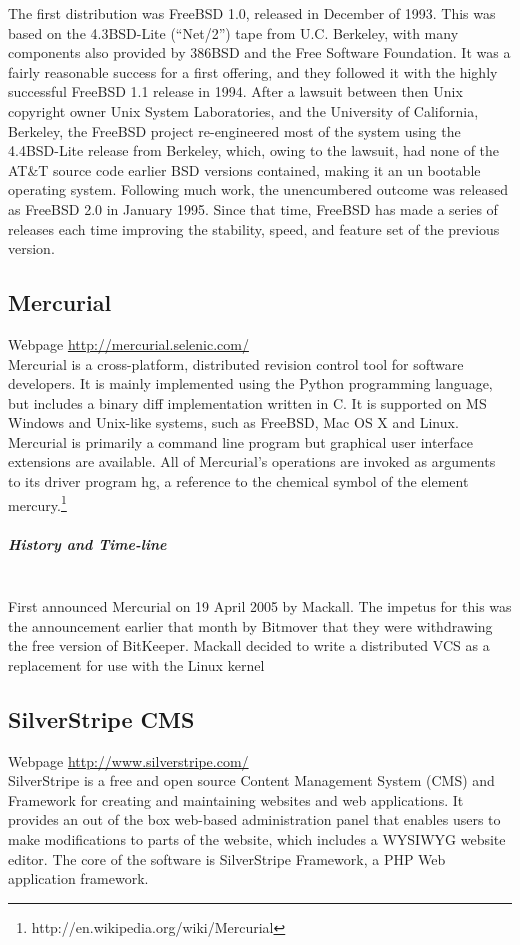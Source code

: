 \documentclass[11pt]{article} %
\begin{document}
The first distribution was FreeBSD 1.0, released in December of 1993. This was based on the 4.3BSD-Lite (“Net/2”) tape from U.C. Berkeley, with many components also provided by 386BSD and the Free Software Foundation. It was a fairly reasonable success for a first offering, and they followed it with the highly successful FreeBSD 1.1 release in  1994.
 After a lawsuit between then Unix copyright owner Unix System Laboratories, and the University of California, Berkeley, the FreeBSD project re-engineered most of the system using the 4.4BSD-Lite release from Berkeley, which, owing to the lawsuit, had none of the AT\&T source code earlier BSD versions contained, making it an un bootable operating system. Following much work, the unencumbered outcome was released as FreeBSD 2.0 in January 1995.
Since that time, FreeBSD has made a series of releases each time improving the stability, speed, and feature set of the previous version.

\subsection{Mercurial}
Webpage \url{http://mercurial.selenic.com/}\\
Mercurial is a cross-platform, distributed revision control tool for software developers. It is mainly implemented using the Python programming language, but includes a binary diff implementation written in C. It is supported on MS Windows and Unix-like systems, such as FreeBSD, Mac OS X and Linux. Mercurial is primarily a command line program but graphical user interface extensions are available. All of Mercurial's operations are invoked as arguments to its driver program hg, a reference to the chemical symbol of the element mercury.\footnote{http://en.wikipedia.org/wiki/Mercurial}

  \subparagraph{History and Time-line} \mbox{} \\
    First announced Mercurial on 19 April 2005 by Mackall. The impetus for this was the announcement earlier that month by Bitmover that they were withdrawing the free version of BitKeeper. Mackall decided to write a distributed VCS as a replacement for use with the Linux kernel

\subsection{SilverStripe CMS} 
Webpage \url{http://www.silverstripe.com/}\\
   SilverStripe is a free and open source Content Management System (CMS) and Framework for creating and maintaining websites and web applications. It provides an out of the box web-based administration panel that enables users to make modifications to parts of the website, which includes a WYSIWYG website editor. The core of the software is SilverStripe Framework, a PHP Web application framework.
  
\end{document}
